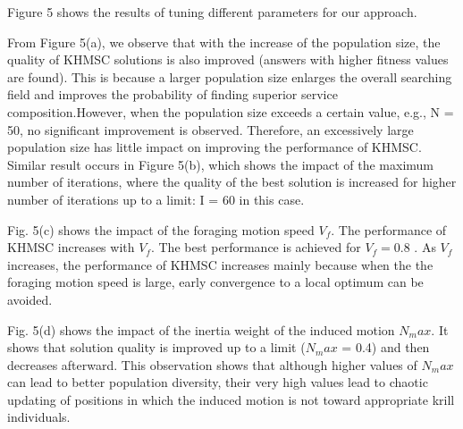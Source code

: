 \documentclass[10pt,journal,compsoc]{IEEEtran}
\begin{document}
Figure 5 shows the results of tuning different parameters for our approach. 

From Figure 5(a), we observe that with the increase of the population size, the quality of KHMSC solutions is also improved (answers with higher fitness values are found). This is because a larger population size enlarges the overall searching field and improves the probability of finding superior service composition.However, when the population size exceeds a certain value, e.g., N = 50, no significant improvement is observed. Therefore, an excessively large population size has little impact on improving the performance of KHMSC. Similar result occurs in Figure 5(b), which shows the impact of the maximum number of iterations, where the quality of the best solution is increased for higher number of iterations up to a limit: I = 60 in this case.

Fig. 5(c) shows the impact of the foraging motion speed $V_f$. The performance of KHMSC increases with $V_f$. The best performance is achieved for $V_f = 0.8$ . As $V_f$ increases, the performance of KHMSC increases mainly because when the the foraging motion speed is large, early convergence to a local optimum can be avoided.

Fig. 5(d) shows the impact of the inertia weight of the induced motion $N_max$. It shows that solution quality is improved up to a limit ($N_max$ = 0.4) and then decreases afterward. This observation shows that although higher values of $N_max$ can lead to better population diversity, their very high values lead to chaotic updating of positions in which the induced motion is not toward appropriate krill individuals.
\end{document}
